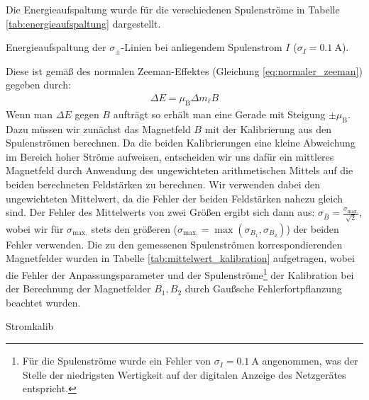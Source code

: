 \documentclass[11pt, a4paper]{article}
\begin{document}
Die Energieaufspaltung wurde für die verschiedenen Spulenströme in Tabelle \ref{tab:energieaufspaltung} dargestellt.
\begin{table}[h]
	\centering
	
	\caption{Energieaufspaltung der $\sigma_\pm$-Linien bei anliegendem Spulenstrom $I$ ($\sigma_I = \SI{0.1}{\ampere}$).}
	\label{tab:energieaufspaltung}
\end{table}
Diese ist gemäß des normalen Zeeman-Effektes (Gleichung \ref{eq:normaler_zeeman}) gegeben durch:
\begin{align}
	\Delta E = \mu_\mathrm{B} \Delta m_\ell B
	\label{eq:normaler_zeeman_auswertung}
\end{align}
Wenn man $\Delta E$ gegen $B$ aufträgt so erhält man eine Gerade mit Steigung $\pm \mu_\mathrm{B}$.
Dazu müssen wir zunächst das Magnetfeld $B$ mit der Kalibrierung aus den Spulenströmen berechnen.
Da die beiden Kalibrierungen eine kleine Abweichung im Bereich hoher Ströme aufweisen, entscheiden wir uns dafür ein mittleres Magnetfeld durch Anwendung des ungewichteten arithmetischen Mittels auf die beiden berechneten Feldstärken zu berechnen.
Wir verwenden dabei den ungewichteten Mittelwert, da die Fehler der beiden Feldstärken nahezu gleich sind.
Der Fehler des Mittelwerts von zwei Größen ergibt sich dann aus: $\sigma_{\bar{B}} = \frac{\sigma_\mathrm{max.}}{\sqrt{2}}$, wobei wir für $\sigma_\mathrm{max.}$ stets den größeren ($\sigma_\mathrm{max.} = \max(\sigma_{B_1}, \sigma_{B_2}) $) der beiden Fehler verwenden.
Die zu den gemessenen Spulenströmen korrespondierenden Magnetfelder wurden in Tabelle \ref{tab:mittelwert_kalibration} aufgetragen, wobei die Fehler der Anpassungsparameter und der Spulenströme\footnote{Für die Spulenströme wurde ein Fehler von $\sigma_I = \SI{0.1}{\ampere}$ angenommen, was der Stelle der niedrigsten Wertigkeit auf der digitalen Anzeige des Netzgerätes entspricht.} der Kalibration bei der Berechnung der Magnetfelder $B_1, B_2$ durch Gaußsche Fehlerfortpflanzung beachtet wurden.
\begin{table}[h]
	\centering
	
	\caption{Stromkalib}
	\label{tab:mittelwert_kalibration}
\end{table}
\end{document}
